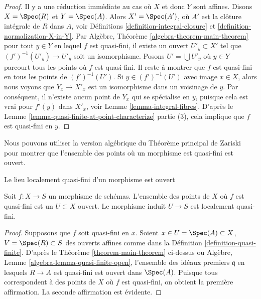 \begin{proof}
Il y a une réduction immédiate au cas où $X$ et donc $Y$
sont affines. Disons $X = \Spec(R)$ et $Y = \Spec(A)$.
Alors $X' = \Spec(A')$, où $A'$ est la clôture
intégrale de $R$ dans $A$, voir Définitions
\ref{definition-integral-closure} et \ref{definition-normalization-X-in-Y}. Par Algèbre,
Théorème \ref{algebra-theorem-main-theorem} pour tout $y \in Y$ en
lequel $f$ est quasi-fini, il existe un ouvert $U'_y \subset X'$
tel que $(f')^{-1}(U'_y) \to U'_y$ soit un isomorphisme. Posons
$U' = \bigcup U'_y$ où $y \in Y$ parcourt tous les points où $f$
est quasi-fini. Il reste à montrer que $f$ est
quasi-fini en tous les points de $(f')^{-1}(U')$. Si
$y \in (f')^{-1}(U')$ avec image $x \in X$, alors nous voyons que
$Y_x \to X'_x$ est un isomorphisme dans un voisinage de $y$. Par conséquent,
il n'existe aucun point de $Y_x$ qui se spécialise en $y$,
puisque cela est vrai pour $f'(y)$ dans $X'_x$, voir Lemme
\ref{lemma-integral-fibres}. D'après le Lemme \ref{lemma-quasi-finite-at-point-characterize} partie (3), cela implique que
$f$ est quasi-fini en $y$.
\end{proof}

\noindent
Nous pouvons utiliser la version algébrique du Théorème principal de Zariski pour montrer
que l'ensemble des points où un morphisme est quasi-fini est ouvert.

\begin{lemma}
\label{lemma-quasi-finite-points-open}
\begin{slogan}
Le lieu localement quasi-fini d'un morphisme est ouvert
\end{slogan}
Soit $f : X \to S$ un morphisme de schémas. L'ensemble
des points de $X$ où $f$ est quasi-fini est un $U \subset X$
ouvert. Le morphisme induit $U \to S$ est localement quasi-fini.
\end{lemma}

\begin{proof}
Supposons que $f$ soit quasi-fini
en $x$. Soient $x \in U = \Spec(A) \subset X$, $V = \Spec(R) \subset S$ des ouverts
affines comme dans la Définition \ref{definition-quasi-finite}. D'après le Théorème
\ref{theorem-main-theorem} ci-dessus ou Algèbre, Lemme \ref{algebra-lemma-quasi-finite-open},
l'ensemble des idéaux premiers $\mathfrak q$ en lesquels
$R \to A$ est quasi-fini est ouvert dans $\Spec(A)$. Puisque
tous correspondent à des points de $X$ où $f$
est quasi-fini, on obtient la première affirmation. La seconde
affirmation est évidente.
\end{proof}

